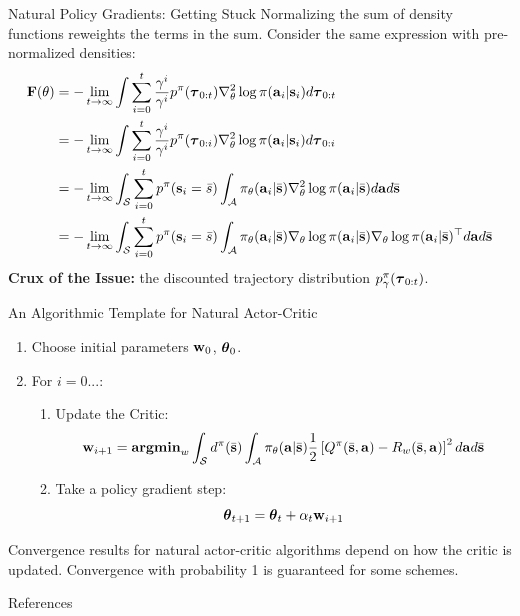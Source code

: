 \documentclass[]{beamer}
\begin{document}
\begin{frame}{Natural Policy Gradients: Getting Stuck}
    Normalizing the sum of density functions reweights the terms in the sum. Consider the same expression with pre-normalized densities:
    {\small \begin{align*}
        \vF(\theta) &= - \lim_{t \rightarrow \infty} \int \sum_{i=0}^t \frac{\gamma^i}{\gamma^i} p^\pi(\vtau_{0:t}) \nabla^2_\theta \log \pi(\va_i | \vs_i) d \vtau_{0:t}\\
        &= - \lim_{t \rightarrow \infty} \int \sum_{i=0}^t \frac{\gamma^i}{\gamma^i} p^\pi(\vtau_{0:i}) \nabla^2_\theta \log \pi(\va_i | \vs_i) d \vtau_{0:i}\\
        &= - \lim_{t \rightarrow \infty} \int_\cS \sum_{i=0}^t p^\pi(\vs_i = \bar s) \int_\cA \pi_\theta(\va_i | \bar \vs) \nabla^2_\theta \log \pi(\va_i | \bar \vs) d \va d \bar \vs\\
        &= - \lim_{t \rightarrow \infty} \int_\cS \sum_{i=0}^t p^\pi(\vs_i = \bar s) \int_\cA \pi_\theta(\va_i | \bar \vs) \nabla_\theta \log \pi(\va_i | \bar \vs) \nabla_\theta \log \pi(\va_i | \bar \vs)^\top d \va d \bar \vs
    \end{align*} }
    \textbf{Crux of the Issue:} the discounted trajectory distribution $p_\gamma^\pi(\vtau_{0:t})$.

\end{frame}

\begin{frame}{An Algorithmic Template for Natural Actor-Critic}

    \begin{enumerate}
        \item Choose initial parameters $\vw_0$, $\vtheta_0$.
        \item For $i = 0 ... $:
        \begin{enumerate}
            \item Update the Critic:
            \[\vw_{i+1} = \textbf{argmin}_w \int_\cS d^\pi(\bar \vs) \int_\cA \pi_\theta(\va | \bar \vs)\frac{1}{2}\left[Q^\pi(\bar \vs, \va) - R_w(\bar \vs, \va) \right]^2 d\va d\bar \vs\]
            \item Take a policy gradient step:
            \[\vtheta_{t+1} = \vtheta_{t} + \alpha_t \vw_{i+1} \]
        \end{enumerate}
    \end{enumerate}

    Convergence results for natural actor-critic algorithms depend on how the critic is updated. Convergence with probability 1 is guaranteed for some schemes.

\end{frame}

\begin{frame}[allowframebreaks]{References}
    
    
\end{frame}
\end{document}
